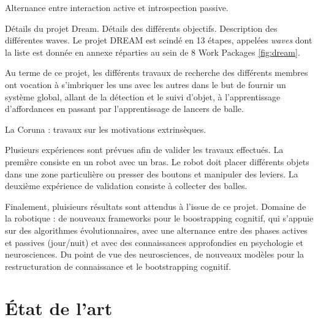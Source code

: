\documentclass{llncs}
\begin{document}
Alternance entre interaction active et introspection passive.

Détails du projet Dream.
Détails des différents objectifs.
Description des différentes waves.
Le projet DREAM est scindé en 13 étapes, appelées \textit{waves} dont la liste est donnée en annexe réparties au sein de 8 Work Packages \ref{fig:dream}.

Au terme de ce projet, les différents travaux de recherche des différents membres ont vocation à s'imbriquer les uns avec les autres dans le but de fournir un système global, allant de la détection et le suivi d'objet, à l'apprentissage d'affordances en passant par l'apprentissage de lancers de balle.

La Coruna : travaux sur les motivations extrinsèques.

Plusieurs expériences sont prévues afin de valider les travaux effectués. La première consiste en un robot avec un bras. Le robot doit placer différents objets dans une zone particulière ou presser des boutons et manipuler des leviers. La deuxième expérience de validation consiste à collecter des balles.

Finalement, pluisieurs résultats sont attendus à l'issue de ce projet. Domaine de la robotique : de nouveaux frameworks pour le boostrapping cognitif, qui s'appuie sur des algorithmes évolutionnaires, avec une alternance entre des phases actives et passives (jour/nuit) et avec des connaissances approfondies en psychologie et neurosciences. Du point de vue des neurosciences, de nouveaux modèles pour la restructuration de connaissance et le bootstrapping cognitif.





\section{\'Etat de l'art}

\end{document}

